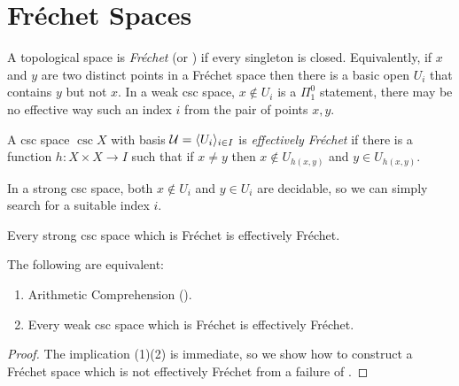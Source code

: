 \documentclass[csc]{subfiles}
\begin{document}
\section{Fr\'echet Spaces}

A topological space is \emph{Fr{\'e}chet} (or ) if every singleton is closed.
Equivalently, if \(x\) and \(y\) are two distinct points in a Fr{\'e}chet space then there is a basic open \(U_i\) that contains \(y\) but not \(x.\)
In a weak csc space, \(x \notin U_i\) is a \(\Pi^0_1\) statement, there may be no effective way such an index \(i\) from the pair of points \(x,y.\)

\begin{definition}[\RCA]
  A csc space \(\csc{X}\) with basis \(\mathcal{U}=\langle U_i\rangle_{i \in I}\) is \emph{effectively Fr{\'e}chet} if there is a function \(h:X \times X \to I\) such that if \(x \neq y\) then \(x \notin U_{h(x,y)}\) and \(y \in U_{h(x,y)}.\)
\end{definition}

In  a strong csc space, both \(x \notin U_i\) and \(y \in U_i\) are decidable, so we can simply search for a suitable index \(i.\)

\begin{proposition}[\RCA]
  Every strong csc space which is Fr{\'e}chet is effectively Fr{\'e}chet.
\end{proposition}

\begin{theorem}[\RCA]
  The following are equivalent:
  \begin{enumerate}[\upshape(1)]
  \item Arithmetic Comprehension \textup(\ACA\textup).
  \item Every weak csc space which is Fr{\'e}chet is effectively Fr{\'e}chet.
  \end{enumerate}
\end{theorem}

\begin{proof}
  The implication (1)\THEN(2) is immediate, so we show how to construct a Fr{\'e}chet space which is not effectively Fr{\'e}chet from a failure of \ACA.

  \TODO
\end{proof}
\end{document}
